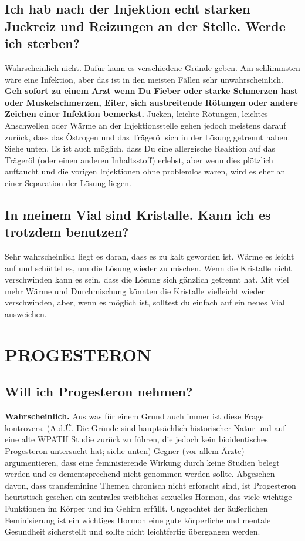 \documentclass{article}
\begin{document}
{{\subsection{Ich hab nach der Injektion echt starken Juckreiz und Reizungen an der Stelle. Werde ich sterben?}

Wahrscheinlich nicht. Dafür kann es verschiedene Gründe geben. Am schlimmsten wäre eine Infektion, aber das ist in den meisten Fällen sehr unwahrscheinlich. \textbf{Geh sofort zu einem Arzt wenn Du Fieber oder starke Schmerzen hast oder Muskelschmerzen, Eiter, sich ausbreitende Rötungen oder andere Zeichen einer Infektion bemerkst. }Jucken, leichte Rötungen, leichtes Anschwellen oder Wärme an der Injektionsstelle gehen jedoch meistens darauf zurück, dass das Östrogen und das Trägeröl sich in der Lösung getrennt haben. Siehe unten. Es ist auch möglich, dass Du eine allergische Reaktion auf das Trägeröl (oder einen anderen Inhaltsstoff) erlebst, aber wenn dies plötzlich auftaucht und die vorigen Injektionen ohne problemlos waren, wird es eher an einer Separation der Lösung liegen.

\subsection{In meinem Vial sind Kristalle. Kann ich es trotzdem benutzen?}

Sehr wahrscheinlich liegt es daran, dass es zu kalt geworden ist. Wärme es leicht auf und schüttel es, um die Lösung wieder zu mischen. Wenn die Kristalle nicht verschwinden kann es sein, dass die Lösung sich gänzlich getrennt hat. Mit viel mehr Wärme und Durchmischung könnten die Kristalle vielleicht wieder verschwinden, aber, wenn es möglich ist, solltest du einfach auf ein neues Vial ausweichen.

 

\section{PROGESTERON}

\subsection{Will ich Progesteron nehmen?}

\textbf{Wahrscheinlich.} Aus was für einem Grund auch immer ist diese Frage kontrovers. (A.d.Ü. Die Gründe sind hauptsächlich historischer Natur und auf eine alte WPATH Studie zurück zu führen, die jedoch kein bioidentisches Progesteron untersucht hat; siehe unten) Gegner (vor allem Ärzte) argumentieren, dass eine feminisierende Wirkung durch keine Studien belegt werden und es dementsprechend nicht genommen werden sollte. Abgesehen davon, dass transfeminine Themen chronisch nicht erforscht sind, ist Progesteron heuristisch gesehen ein zentrales weibliches sexuelles Hormon, das viele wichtige Funktionen im Körper und im Gehirn erfüllt. Ungeachtet der äußerlichen Feminisierung ist ein wichtiges Hormon eine gute körperliche und mentale Gesundheit sicherstellt und sollte nicht leichtfertig übergangen werden.

}}
\end{document}
